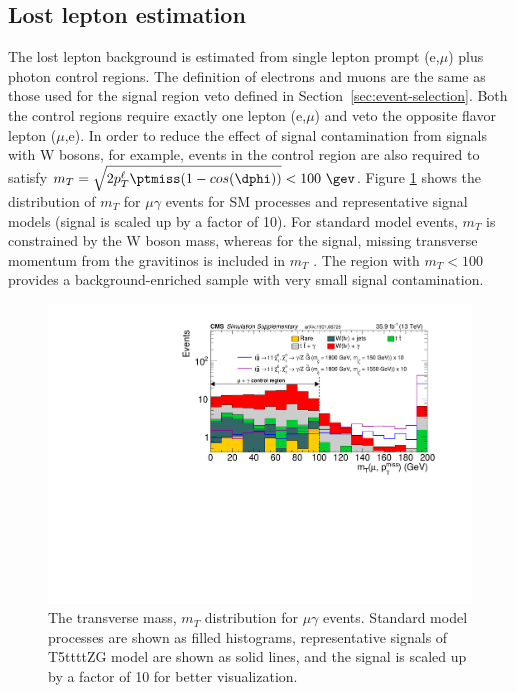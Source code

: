 \subsection{Lost lepton estimation}
\label{subsec:lostlept}
The lost lepton background is estimated from single lepton prompt (e,$\mu$) plus 
photon control regions. 
The definition of electrons and muons are the same as those used for the signal region 
veto defined in Section~\ref{sec:event-selection}.  Both the control regions require
exactly one lepton (e,$\mu$) and veto the opposite flavor lepton ($\mu$,e). In 
order to reduce the effect of signal contamination from signals with W bosons, for 
example, events in the control region are also required to satisfy $m_T=\sqrt{2p_{T}^{\ell}\ptmiss(1-cos(\dphi))}<100~\gev$. 
Figure \ref{fig:supp_Sim_MuGammaCS_mT_T5ttttZG} shows the distribution of $m_T$ for $\mu\gamma$ events
for SM processes and representative signal models (signal is scaled up by a factor of 10).
For standard model events, $m_T$ is constrained by the W boson mass, whereas for the signal,
missing transverse momentum from the gravitinos is included in $m_T$ .
The region with $m_T < 100$ \gev provides a background-enriched sample with very small signal contamination.
\begin{figure}[h!]
\centering
\includegraphics[width=0.8\linewidth]{../Figures/Chap3/anaPublic/supp_Sim_MuGammaCS_mT_T5ttttZG}
\captionsetup{width=.9\linewidth}
\caption[$m_T$ distribution for $\mu\gamma$ control region]{The transverse mass, $m_{T}$ distribution for $\mu\gamma$ events. Standard model processes are shown as filled histograms, representative signals of T5ttttZG model are shown as solid lines, and the signal is scaled up by a factor of 10 for better visualization.}
\label{fig:supp_Sim_MuGammaCS_mT_T5ttttZG}
\end{figure}

